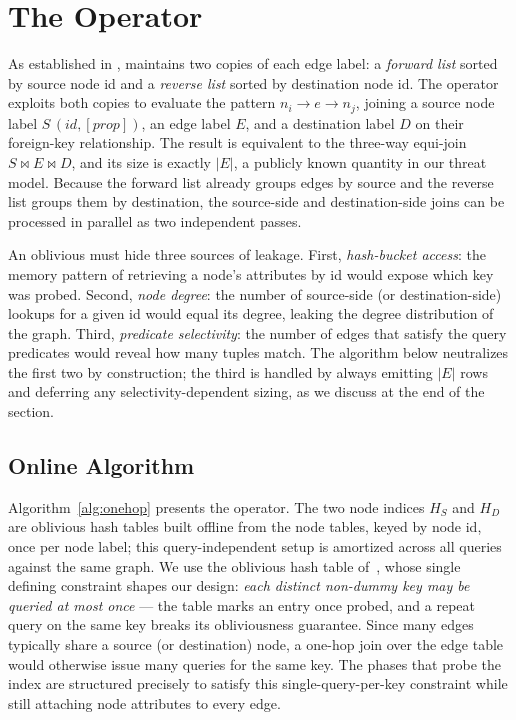\section{The \Onehop Operator}
\label{sec:onehop}

As established in , \system maintains two copies of
each edge label: a \emph{forward list} sorted by source node id and a
\emph{reverse list} sorted by destination node id. The \onehop operator exploits
both copies to evaluate the pattern $n_i \rightarrow e \rightarrow n_j$, joining a
source node label $S\,(id, [\mathit{prop}])$, an edge label $E$, and a
destination label $D$ on their foreign-key relationship. The result is equivalent
to the three-way equi-join $S \bowtie E \bowtie D$, and its size is exactly
$|E|$, a publicly known quantity in our threat model. Because the forward list
already groups edges by source and the reverse list groups them by destination,
the source-side and destination-side joins can be processed in parallel as two
independent passes.

An oblivious \onehop must hide three sources of leakage. First,
\emph{hash-bucket access}: the memory pattern of retrieving a node's attributes
by id would expose which key was probed. Second, \emph{node degree}: the number
of source-side (or destination-side) lookups for a given id would equal its
degree, leaking the degree distribution of the graph. Third, \emph{predicate
selectivity}: the number of edges that satisfy the query predicates would reveal
how many tuples match. The algorithm below neutralizes the first two by
construction; the third is handled by always emitting $|E|$ rows and deferring
any selectivity-dependent sizing, as we discuss at the end of the section.

\subsection{Online Algorithm}
\label{sec:onehop:algorithm}

Algorithm~\ref{alg:onehop} presents the operator. The two node indices $H_S$ and
$H_D$ are oblivious hash tables built offline from the node tables, keyed by node
id, once per node label; this query-independent setup is amortized across all
queries against the same graph. We use the oblivious hash table
of~\cite{h2o2ram}, whose single defining constraint shapes our design:
\emph{each distinct non-dummy key may be queried at most once} --- the table
marks an entry once probed, and a repeat query on the same key breaks its
obliviousness guarantee. Since many edges typically share a source (or
destination) node, a one-hop join over the edge table would otherwise issue many
queries for the same key. The phases that probe the index are structured
precisely to satisfy this single-query-per-key constraint while still attaching
node attributes to every edge.

